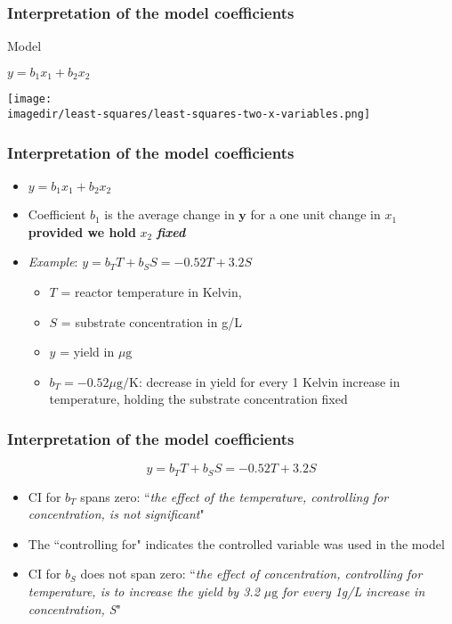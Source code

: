 \begin{frame}\frametitle{Interpretation of the model coefficients}
	\begin{block}
		{Model}
		\begin{center}
			$y = b_1x_1 + b_2x_2$
		\end{center}
	\end{block}
	\begin{center}
		\texttt{[image: \\imagedir/least-squares/least-squares-two-x-variables.png]}
	\end{center}
\end{frame}

\begin{frame}\frametitle{Interpretation of the model coefficients}
	\begin{itemize}
		\item	$y = b_1x_1 + b_2x_2$
	\end{itemize}
	\begin{itemize}
		\item	Coefficient $b_1$ is the average change in $\mathbf{y}$ for a one unit change in ${x}_1$ \textbf{provided we hold} ${x}_2$ \textbf{\emph{fixed}}
	\end{itemize}
	\begin{itemize}
		\item	\emph{Example}: $y = b_T T + b_S S = -0.52 T + 3.2 S$
		\begin{itemize}
			\item	$T$ = reactor temperature in Kelvin,
			\item	$S$ = substrate concentration in g/L
			\item	$y$ = yield in $\mu\text{g}$
			\item	$b_T = -0.52 \mu\text{g}/\text{K}$: decrease in yield for every 1 Kelvin increase in temperature, holding the substrate concentration fixed
		\end{itemize}
	\end{itemize}
\end{frame}

\begin{frame}\frametitle{Interpretation of the model coefficients}

	$$y = b_T T + b_S S = -0.52 T + 3.2 S$$
	\begin{itemize}
		\item	CI for $b_T$ spans zero: ``\emph{the effect of the temperature, controlling for concentration, is not significant}"
		\item	The ``controlling for" indicates the controlled variable was used in the model
		\item	CI for $b_S$ does not span zero: ``\emph{the effect of concentration, controlling for temperature, is to increase the yield by 3.2 $\mu\text{g}$ for every 1g/L increase in concentration, S}"
	\end{itemize}
\end{frame}


